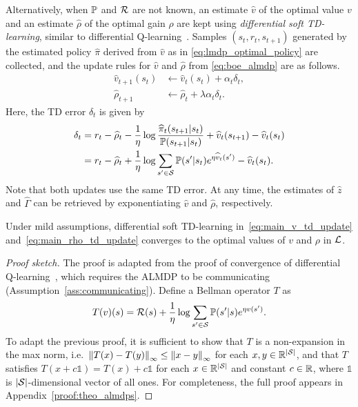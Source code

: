 Alternatively, when $\mathbb{P}$ and $\mathcal{R}$ are not known, an estimate $\widehat v$ of the optimal value $v$ and an estimate $\widehat\rho$ of the optimal gain $\rho$ are kept using \textit{differential soft TD-learning}, similar to differential Q-learning~\citep{Wan2021}. Samples $(s_t, r_t, s_{t+1})$ generated by the estimated policy $\widehat\pi$ derived from $\widehat v$ as in \eqref{eq:lmdp_optimal_policy} are collected, and the update rules for $\widehat v$ and $\widehat \rho$ from \eqref{eq:boe_almdp} are as follows.
\begin{align}
    \widehat{v}_{t+1}(s_t) &\gets \widehat{v}_t(s_t) + \alpha_t \delta_t,\label{eq:main_v_td_update}\\
    \widehat{\rho}_{t+1} &\gets \widehat{\rho}_t + \lambda \alpha_t \delta_t.\label{eq:main_rho_td_update}
    \end{align}
Here, the TD error $\delta_t$ is given by
\begin{align*}
\delta_t &= r_t - \widehat{\rho}_t - \frac 1 \eta \log \frac {\widehat{\pi}_t(s_{t+1}|s_t)} {\mathbb{P}(s_{t+1}|s_t)} + \widehat{v}_t(s_{t+1}) - \widehat{v}_t(s_t)\\
 &= r_t - \widehat{\rho}_t + \frac 1 \eta \log \sum_{s'\in\mathcal{S}} \mathbb{P}(s'|s_t) e^{\eta \widehat{v}_t(s')} - \widehat{v}_t(s_t).
\end{align*}
Note that both updates use the same TD error. At any time, the estimates of $\widehat z$ and $\widehat\Gamma$ can be retrieved by exponentiating $\widehat v$ and $\widehat \rho$, respectively.


\begin{theorem}
    Under mild assumptions, differential soft TD-learning in~\eqref{eq:main_v_td_update} and~\eqref{eq:main_rho_td_update} converges to the optimal values of $v$ and $\rho$ in $\mathcal{L}$. \label{theo:almdps}
\end{theorem}

\begin{proof}[Proof sketch]
The proof is adapted from the proof of convergence of differential Q-learning~\cite{Abounadi2001,Wan2021}, which requires the ALMDP to be communicating (Assumption~\ref{ass:communicating}).
Define a Bellman operator $T$ as
\[
T(v)(s) = \mathcal{R}(s) + \frac 1 \eta \log \sum_{s'\in\mathcal{S}} \mathbb{P}(s'|s) e^{ \eta v(s') }.
\]
To adapt the previous proof, it is sufficient to show that $T$ is a non-expansion in the max norm, i.e.~$\left\|T(x)-T(y)\right\|_\infty \leq \left\|x - y\right\|_\infty$ for each $x, y\in\mathbb{R}^{|\mathcal{S}|}$, and that $T$ satisfies $T(x + c\mathds{1}) = T(x) + c\mathds{1}$ for each $x\in\mathbb{R}^{|\mathcal{S}|}$ and constant $c\in\mathbb{R}$, where $\mathds{1}$ is $|\mathcal{S}|$-dimensional vector of all ones.
For completeness, the full proof appears in Appendix~\ref{proof:theo_almdps}.
\end{proof}


